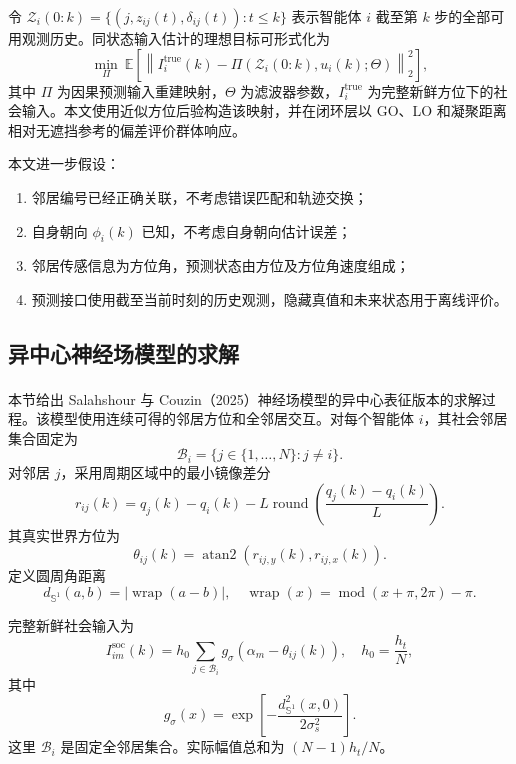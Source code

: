 \documentclass[UTF8,fontset=windows,11pt]{ctexart}
\newcommand{\upcite}[1]{\textsuperscript{\cite{#1}}}
\begin{document}
令 $\mathcal Z_i(0:k)=\{(j,z_{ij}(t),\delta_{ij}(t)):t\le k\}$ 表示智能体 $i$ 截至第 $k$ 步的全部可用观测历史。同状态输入估计的理想目标可形式化为
\begin{equation}
 \min_{\Pi}\ \mathbb E\left[
 \left\|I_i^{\mathrm{true}}(k)-\Pi(\mathcal Z_i(0:k),u_i(k);\Theta)\right\|_2^2
 \right],
\end{equation}
其中 $\Pi$ 为因果预测输入重建映射，$\Theta$ 为滤波器参数，$I_i^{\mathrm{true}}$ 为完整新鲜方位下的社会输入。本文使用近似方位后验构造该映射，并在闭环层以 GO、LO 和凝聚距离相对无遮挡参考的偏差评价群体响应。

本文进一步假设：

\begin{enumerate}[label=(\arabic*)]
 \item 邻居编号已经正确关联，不考虑错误匹配和轨迹交换；
 \item 自身朝向 $\phi_i(k)$ 已知，不考虑自身朝向估计误差；
 \item 邻居传感信息为方位角，预测状态由方位及方位角速度组成；
 \item 预测接口使用截至当前时刻的历史观测，隐藏真值和未来状态用于离线评价。
\end{enumerate}

\subsection{异中心神经场模型的求解}

本节给出 Salahshour 与 Couzin（2025）神经场模型的异中心表征版本\upcite{Salahshour2025}的求解过程。该模型使用连续可得的邻居方位和全邻居交互。对每个智能体 $i$，其社会邻居集合固定为
\begin{equation}
 \mathcal B_i=\{j\in\{1,\ldots,N\}:j\ne i\}.
\end{equation}
对邻居 $j$，采用周期区域中的最小镜像差分
\begin{equation}
 r_{ij}(k)=q_j(k)-q_i(k)-L\operatorname{round}\left(\frac{q_j(k)-q_i(k)}{L}\right).
\end{equation}
其真实世界方位为
\begin{equation}
 \theta_{ij}(k)=\operatorname{atan2}(r_{ij,y}(k),r_{ij,x}(k)).
\end{equation}
定义圆周角距离
\begin{equation}
 d_{\mathbb S^1}(a,b)=\left|\operatorname{wrap}(a-b)\right|,
\quad \operatorname{wrap}(x)=\operatorname{mod}(x+\pi,2\pi)-\pi.
\end{equation}

完整新鲜社会输入为
\begin{equation}
 I^{\mathrm{soc}}_{im}(k)=h_0\sum_{j\in\mathcal B_i}
 g_\sigma\left(\alpha_m-\theta_{ij}(k)\right),
 \quad h_0=\frac{h_t}{N},
\end{equation}
其中
\begin{equation}
 g_\sigma(x)=\exp\left[-\frac{d_{\mathbb S^1}^2(x,0)}{2\sigma_s^2}\right].
\end{equation}
这里 $\mathcal B_i$ 是固定全邻居集合。实际幅值总和为 $(N-1)h_t/N$。
\end{document}
